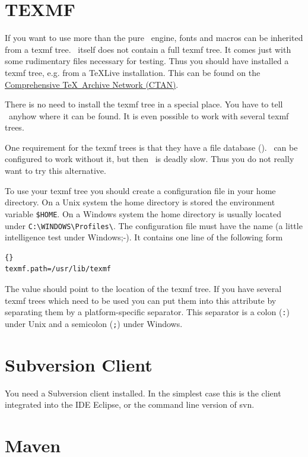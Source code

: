 \section{TEXMF}

If you want to use more than the pure \ExTeX\ engine, fonts and macros
can be inherited from a texmf tree. \ExTeX\ itself does
not contain a full texmf tree. It comes just with some rudimentary
files necessary for testing. Thus you should have installed a texmf
tree, e.g. from a \TeX Live installation.
This can be found on the \href{http://www.ctan.org}{Comprehensive
  \TeX\ Archive Network (CTAN)}.

There is no need to install the texmf tree in a special place. You
have to tell \ExTeX\ anyhow where it can be found. It is even possible
to work with several texmf trees.

One requirement for the texmf trees is that they have a file database
(). \ExTeX\ can be configured to work without it, but then
\ExTeX\ is deadly slow. Thus you do not really want to try this
alternative.

To use your texmf tree you should create a configuration file in your
home directory. On a Unix system the home directory is stored the
environment variable \verb|$HOME|. On a Windows system the home
directory is usually located under \verb|C:\WINDOWS\Profiles\|.  The
configuration file must have the name  (a little
intelligence test under Windows;-). It contains one line of the
following form

\begin{lstlisting}{}
texmf.path=/usr/lib/texmf
\end{lstlisting}

The value should point to the location of the texmf tree. If you have
several texmf trees which need to be used you can put them into this
attribute by separating them by a platform-specific separator. This
separator is a colon (\verb|:|) under Unix and a semicolon (\verb|;|)
under Windows.


\section{Subversion Client}

You need a Subversion client installed. In the simplest case this is the
client integrated into the IDE Eclipse, or the command line version of svn.


\section{Maven}

